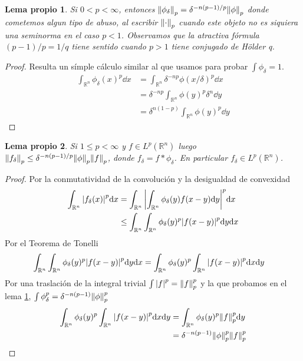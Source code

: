 \documentclass{article}
\newcommand{\realNumbers}{\mathbb{R}}
\newtheorem{myLemma}{Lema propio}
\theoremstyle{remark}
\begin{document}
\begin{myLemma}
  \label{myLemma:mollifierpNorm}
  Si \(0 < p < \infty\), entonces \(\norm{\phi_{\delta}}_p = \delta^{- n (p - 1) / p} \norm{\phi}_p\) donde cometemos algun tipo de abuso, al escribir \(\norm{\cdot}_p\) cuando este objeto no es siquiera una seminorma en el caso \(p < 1\).
  Observamos que la atractiva fórmula \((p - 1) / p = 1 / q\) tiene sentido cuando \(p > 1\) tiene conjugado de Hölder q.
\end{myLemma}
\begin{proof}
  Resulta un símple cálculo similar al que usamos para probar \(\int \phi_{\delta} = 1\).
  \begin{align}
    \int_{\realNumbers^n} \phi_{\delta}(x)^p \dd x
    &=
    \int_{\realNumbers^n} \delta^{- n p} \phi(x / \delta)^p \dd x
    \\
    &=
    \delta^{- n p} \int_{\realNumbers^n} \phi(y)^p \delta^n \dd y
    \\
    &=
    \delta^{n (1 - p)} \int_{\realNumbers^n} \phi(y)^p \dd y
  \end{align}
\end{proof}

\begin{myLemma}
  Si \(1 \leq p < \infty\) y \(f \in L^p(\realNumbers^n)\) luego \(\norm{f_{\delta}}_p \leq \delta^{- n (p - 1) / p} \norm{\phi}_p \norm{f}_p\), donde \(f_{\delta} = f * \phi_{\delta}\).
  En particular \(f_{\delta} \in L^p(\realNumbers^n)\).
\end{myLemma}
\begin{proof}
  Por la conmutatividad de la convolución y la desigualdad de convexidad
  \begin{align}
    \int_{\realNumbers^n} \abs{f_{\delta}(x)}^p \dd x
    &=
    \int_{\realNumbers^n} \abs{\int_{\realNumbers^n} \phi_{\delta}(y) f(x - y) \dd y}^p \dd x
    \\
    &\leq
    \int_{\realNumbers^n} \int_{\realNumbers^n} \phi_{\delta}(y)^p \abs{f(x - y)}^p \dd y \dd x
  \end{align}
  Por el Teorema de Tonelli
  \begin{align}
    \int_{\realNumbers^n} \int_{\realNumbers^n} \phi_{\delta}(y)^p \abs{f(x - y)}^p \dd y \dd x
    &=
    \int_{\realNumbers^n} \phi_{\delta}(y)^p \int_{\realNumbers^n} \abs{f(x - y)}^p \dd x \dd y
  \end{align}
  Por una traslación de la integral trivial \(\int \abs{f}^p = \norm{f}_p^p\) y la que probamos en el lema \ref{myLemma:mollifierpNorm}, \(\int \phi_{\delta}^p = \delta^{- n (p - 1)} \norm{\phi}_p^p\) 
  \begin{align}
    \int_{\realNumbers^n} \phi_{\delta}(y)^p \int_{\realNumbers^n} \abs{f(x - y)}^p \dd x \dd y
    &=
    \int_{\realNumbers^n} \phi_{\delta}(y)^p \norm{f}_p^p \dd y
    \\
    &=
    \delta^{- n (p - 1)} \norm{\phi}_p^p \norm{f}_p^p
  \end{align}
\end{proof}
\end{document}
